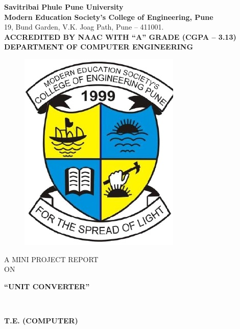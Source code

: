 \documentclass[a4paper, 12pt]{report}
\begin{document}
\newenvironment{frontmatter}{}{}
\begin{frontmatter}
\begin{titlepage}
\begin{center}
\textup{\large  \textbf{Savitribai Phule Pune University}\\\textbf{Modern Education Society’s College of Engineering, Pune}}\\19, Bund Garden, V.K. Joag Path, Pune – 411001.\\[0.5cm]\textbf{ACCREDITED BY NAAC WITH \enquote{A} GRADE (CGPA – 3.13)}\\[0.5cm]\textbf{\large DEPARTMENT OF COMPUTER ENGINEERING}
\begin{center}
\begin{figure}[h]
\centering
\includegraphics[width=0.3\linewidth]{./logo}
\end{figure}
\end{center}
\textup{\large  A MINI PROJECT REPORT\\[0.8cm]ON}\\[0.8cm]
\begin{LARGE}
{\textbf {\enquote{UNIT CONVERTER}}}\end{LARGE}\\[1.2cm]
\begin{large}\textbf {T.E. (COMPUTER)}

\end{large}
\end{center}
\end{titlepage}
\end{frontmatter}
\end{document}
